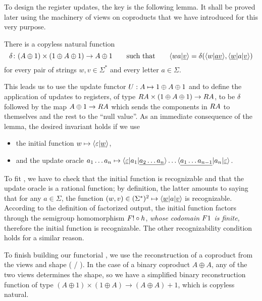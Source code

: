 To design the register updates, the key is the following lemma. It shall be proved later using the machinery of views on coproducts that we have introduced for this very purpose.
\begin{lemma}\label{lem:compute-next-configuration}
  There is a {copyless} natural function
  \[
    \delta\colon (A \oplus 1) \times (1 \oplus A \oplus 1) \to A \oplus 1
    \qquad\text{such that}\qquad
    \langle wa|\underline v \rangle = \delta(\langle w|\underline {av} \rangle,\langle \underline w | a|\underline v \rangle)
  \]
  for every pair of strings $w,v \in \Sigma^*$ and every letter $a \in \Sigma$.
\end{lemma}
This leads us to use the update functor $\functoru : A \mapsto 1 \oplus A \oplus 1$ and to define the application of updates to registers, of type $\functorr A \times (1 \oplus A \oplus 1) \to \functorr A$, to be $\delta$ followed by the map $A \oplus 1 \to \functorr A$ which sends the components in $\functorr A$ to themselves and the rest to the \enquote{null value}.
As an immediate consequence of the lemma, the desired invariant holds if we use
\begin{itemize}
  \item the initial function $w \mapsto \langle \varepsilon|\underline{w} \rangle$,
  \item and the update oracle $a_1 \dots a_n \mapsto \langle \underline\varepsilon|a_1|\underline{a_2 \dots a_n} \rangle \dots
  \langle \underline{a_1 \dots a_{n-1}}|a_n|\underline\varepsilon \rangle$.
\end{itemize}
To fit , we have to check that the initial function is recognizable and that the update oracle is a rational function; by definition, the latter amounts to saying that for any $a\in\Sigma$, the function $(w,v) \in (\Sigma^*)^2 \mapsto \langle \underline{w}|a|\underline{v} \rangle$ is recognizable. According to the definition of factorized output, the initial function factors through the semigroup homomorphism $\functor! \circ h$, \emph{whose codomain $\functor1$ is finite,} therefore the initial function is recognizable. The other recognizability condition holds for a similar reason.

To finish building our functorial \sst, we use the reconstruction of a coproduct from the views and shape ( / ). In the case of a binary coproduct $A \oplus A$, any of the two views determines the shape, so we have a simplified binary reconstruction function of type $(A\oplus1)\times(1\oplus A) \to (A\oplus A)+1$, which is copyless natural.

